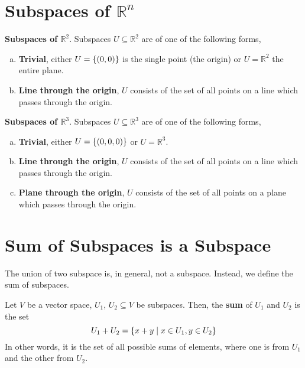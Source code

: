 \documentclass[letterpaper,12pt]{article}
\begin{document}
\section*{Subspaces of $\mathbb{R}^n$}
\begin{example}
\textbf{Subspaces of $\mathbb{R}^2$}. Subspaces $U \subseteq \mathbb{R}^2$ are of one of the following forms,
\begin{enumerate}[(a)]
    \item \textbf{Trivial}, either $U = \left\{ (0,0) \right\}$ is the single point (the origin) or $U = \mathbb{R}^2$ the entire plane.
    \item \textbf{Line through the origin}, $U$ consists of the set of all points on a line which passes through the origin.
\end{enumerate}
\end{example}

\begin{example}
\textbf{Subspaces of $\mathbb{R}^3$}. Subspaces $U \subseteq \mathbb{R}^3$ are of one of the following forms,
\begin{enumerate}[(a)]
    \item \textbf{Trivial}, either $U = \left\{ (0,0,0) \right\}$ or $U = \mathbb{R}^3$.
    \item \textbf{Line through the origin}, $U$ consists of the set of all points on a line which passes through the origin.
    \item \textbf{Plane through the origin}, $U$ consists of the set of all points on a plane which passes through the origin.
\end{enumerate}
\end{example}

\section*{Sum of Subspaces is a Subspace}
The union of two subspace is, in general, not a subspace. Instead, we define the sum of subspaces.
\begin{definition}
Let $V$ be a vector space, $U_1$, $U_2 \subseteq V$ be subspaces. Then, the \textbf{sum} of $U_1$ and $U_2$ is the set
\begin{equation*}
    U_1 + U_2 = \left\{ x + y \mid x \in U_1, y \in U_2 \right\}
\end{equation*}
In other words, it is the set of all possible sums of elements, where one is from $U_1$ and the other from $U_2$.
\end{definition}
\end{document}
